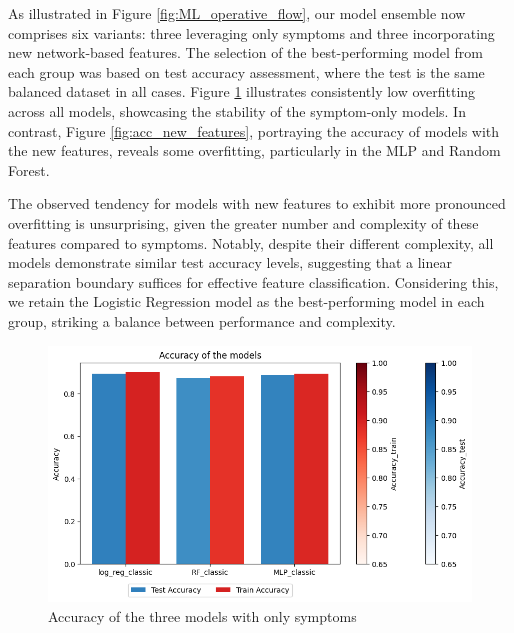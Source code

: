 As illustrated in Figure \ref{fig:ML_operative_flow}, our model ensemble now comprises six variants: 
three leveraging only symptoms and three incorporating new network-based features. The selection of 
the best-performing model from each group was based on test accuracy assessment, where the test is the same balanced dataset
in all cases. Figure \ref{fig:acc_symptoms} 
illustrates consistently low overfitting across all models, showcasing the stability of the symptom-only 
models. In contrast, Figure \ref{fig:acc_new_features}, portraying the accuracy of models with the new 
features, reveals some overfitting, particularly in the MLP and Random Forest.

The observed tendency for models with new features to exhibit more pronounced overfitting is unsurprising, 
given the greater number and complexity of these features compared to symptoms. Notably, despite their different
complexity, all models demonstrate similar test accuracy levels, suggesting that a linear separation 
boundary suffices for effective feature classification. Considering this, we retain the Logistic Regression 
model as the best-performing model in each group, striking a balance between performance and complexity.

\begin{figure}[H]
	\centering
	\includegraphics[width=\columnwidth]{images/acc_symptoms.png}
	\caption{Accuracy of the three models with only symptoms}
	\label{fig:acc_symptoms}
\end{figure}

